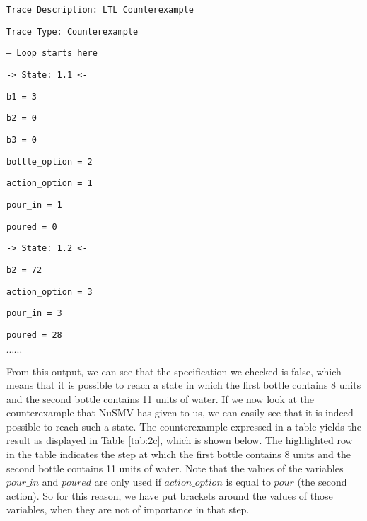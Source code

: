 \documentclass[a4paper]{article}
\begin{document}
{{\tt Trace Description: LTL Counterexample }

{\tt Trace Type: Counterexample }

{\tt   -- Loop starts here }

{\tt   -> State: 1.1 <- }

{\tt     b1 = 3 }

{\tt     b2 = 0 }

{\tt     b3 = 0 }

{\tt     bottle\_option = 2 }

{\tt     action\_option = 1 }

{\tt     pour\_in = 1 }

{\tt     poured = 0 }

{\tt   -> State: 1.2 <- }

{\tt     b2 = 72 }

{\tt     action\_option = 3 }

{\tt     pour\_in = 3 }

{\tt     poured = 28 }

$\cdots \cdots$

From this output, we can see that the specification we checked is false, which means that it is possible to reach a state in which the first bottle contains 8 units and the second bottle contains 11 units of water. If we now look at the counterexample that NuSMV has given to us, we can easily see that it is indeed possible to reach such a state. The counterexample expressed in a table yields the result as displayed in Table \ref{tab:2c}, which is shown below. The highlighted row in the table indicates the step at which the first bottle contains 8 units and the second bottle contains 11 units of water. Note that the values of the variables $pour\_in$ and $poured$ are only used if $action\_option$ is equal to $pour$ (the second action). So for this reason, we have put brackets around the values of those variables, when they are not of importance in that step.

}
\end{document}
